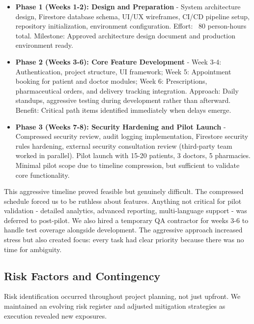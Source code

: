 \documentclass[12pt,a4paper]{report}
\begin{document}
\begin{itemize}
  \item \textbf{Phase 1 (Weeks 1-2): Design and Preparation} - System architecture design, Firestore database schema, UI/UX wireframes, CI/CD pipeline setup, repository initialization, environment configuration. Effort: ~80 person-hours total. Milestone: Approved architecture design document and production environment ready.

  \item \textbf{Phase 2 (Weeks 3-6): Core Feature Development} - Week 3-4: Authentication, project structure, UI framework; Week 5: Appointment booking for patient and doctor modules; Week 6: Prescriptions, pharmaceutical orders, and delivery tracking integration. Approach: Daily standups, aggressive testing during development rather than afterward. Benefit: Critical path items identified immediately when delays emerge.

  \item \textbf{Phase 3 (Weeks 7-8): Security Hardening and Pilot Launch} - Compressed security review, audit logging implementation, Firestore security rules hardening, external security consultation review (third-party team worked in parallel). Pilot launch with 15-20 patients, 3 doctors, 5 pharmacies. Minimal pilot scope due to timeline compression, but sufficient to validate core functionality.
\end{itemize}

This aggressive timeline proved feasible but genuinely difficult. The compressed schedule forced us to be ruthless about features. Anything not critical for pilot validation - detailed analytics, advanced reporting, multi-language support - was deferred to post-pilot. We also hired a temporary QA contractor for weeks 3-6 to handle test coverage alongside development. The aggressive approach increased stress but also created focus: every task had clear priority because there was no time for ambiguity.

\subsection{Risk Factors and Contingency}

Risk identification occurred throughout project planning, not just upfront. We maintained an evolving risk register and adjusted mitigation strategies as execution revealed new exposures.
\end{document}

